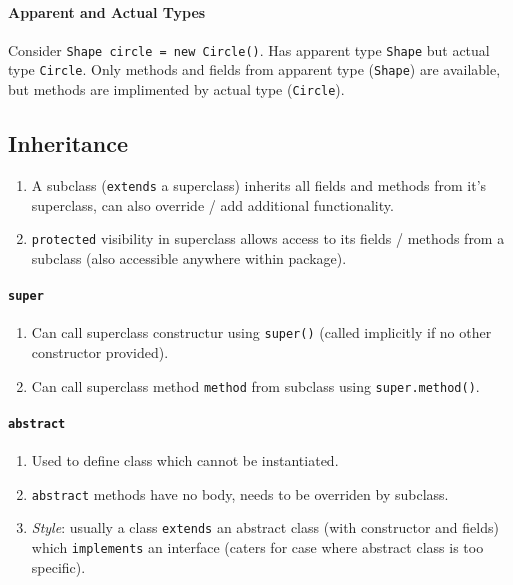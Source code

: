 \documentclass[twocolumn,english]{article}
\begin{document}
\paragraph{Apparent and Actual Types}

Consider \texttt{Shape circle = new Circle()}. Has apparent type \texttt{Shape}
but actual type \texttt{Circle}. Only methods and fields from apparent
type (\texttt{Shape}) are available, but methods are implimented by
actual type (\texttt{Circle}).


\subsection{Inheritance}
\begin{enumerate}
\item A subclass (\texttt{extends} a superclass) inherits all fields and
methods from it's superclass, can also override / add additional functionality.
\item \texttt{protected} visibility in superclass allows access to its fields
/ methods from a subclass (also accessible anywhere within package).
\end{enumerate}

\paragraph{\texttt{super}}
\begin{enumerate}
\item Can call superclass constructur using \texttt{super()} (called implicitly
if no other constructor provided).
\item Can call superclass method \texttt{method} from subclass using \texttt{super.method()}.
\end{enumerate}

\paragraph{\texttt{abstract}}
\begin{enumerate}
\item Used to define class which cannot be instantiated.
\item \texttt{abstract} methods have no body, needs to be overriden by subclass.
\item \emph{Style}: usually a class \texttt{extends} an abstract class (with
constructor and fields) which \texttt{implements} an interface (caters
for case where abstract class is too specific).
\end{enumerate}
\end{document}
